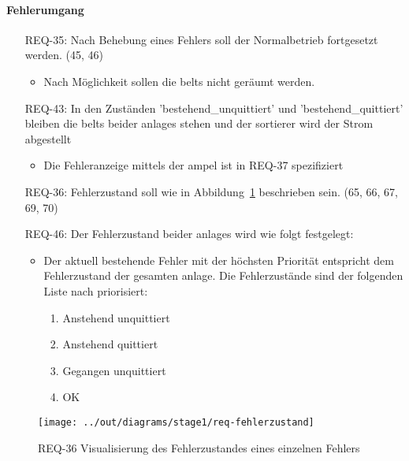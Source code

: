 \paragraph{Fehlerumgang}
\begin{itemize}
    \item[REQ-35:] Nach Behebung eines Fehlers soll der Normalbetrieb fortgesetzt werden. (45, 46)
    \begin{itemize}
        \item Nach Möglichkeit sollen die \glspl{belt} nicht geräumt werden.
    \end{itemize}
    \item[REQ-43:] In den Zuständen 'bestehend\_unquittiert' und 'bestehend\_quittiert' bleiben die
    \glspl{belt} beider \glspl{anlage} stehen und der \gls{sortierer} wird der Strom abgestellt
    \begin{itemize}
        \item Die Fehleranzeige mittels der \gls{ampel} ist in REQ-37 spezifiziert
    \end{itemize}
    \item[REQ-36:] Fehlerzustand soll wie in Abbildung~\ref{fig:stm-fehlerzustand} beschrieben sein. (65, 66, 67, 69, 70)
    \item[REQ-46:] Der Fehlerzustand beider \glspl{anlage} wird wie folgt festgelegt:
    \begin{itemize}
        \item Der aktuell bestehende Fehler mit der höchsten Priorität entspricht dem Fehlerzustand der gesamten \gls{anlage}.
        Die Fehlerzustände sind der folgenden Liste nach priorisiert:
    \begin{enumerate} %
        \item Anstehend unquittiert
        \item Anstehend quittiert
        \item Gegangen unquittiert
        \item OK
    \end{enumerate}
    \end{itemize}
\end{itemize}

\begin{figure}[h]
    \centering
    \texttt{[image: ../out/diagrams/stage1/req-fehlerzustand]}
    \caption{REQ-36 Visualisierung des Fehlerzustandes eines einzelnen Fehlers}
    \label{fig:stm-fehlerzustand}
\end{figure}
